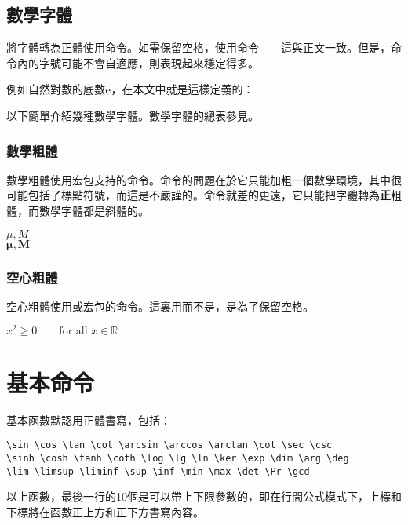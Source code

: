 \subsection{數學字體}
將字體轉為正體使用命令。如需保留空格，使用命令——這與正文一致。但是，命令內的字號可能不會自適應，則表現起來穩定得多。

例如自然對數的底數$\ue$，在本文中就是這樣定義的：
\begin{latex}
\newcommand{\ue}{\mathrm{e}}
\end{latex}

以下簡單介紹幾種數學字體。數學字體的總表參見。

\subsubsection{數學粗體}
數學粗體使用宏包支持的命令。命令的問題在於它只能加粗一個數學環境，其中很可能包括了標點符號，而這是不嚴謹的。命令就差的更遠，它只能把字體轉為\textbf{正}粗體，而數學字體都是斜體的。

\begin{codeshow}
$\mu,M$\\ $\boldsymbol{\mu},
\boldsymbol{M}$
\end{codeshow}

\subsubsection{空心粗體}
空心粗體使用或宏包的命令。這裏用而不是，是為了保留空格。

\begin{codeshow}
$x^2 \geq 0 \qquad
\textrm{for all }x\in\mathbb{R}$
\end{codeshow}

\section{基本命令}
基本函數默認用正體書寫，包括：
\begin{verbatim}
\sin \cos \tan \cot \arcsin \arccos \arctan \cot \sec \csc
\sinh \cosh \tanh \coth \log \lg \ln \ker \exp \dim \arg \deg 
\lim \limsup \liminf \sup \inf \min \max \det \Pr \gcd
\end{verbatim}

以上函數，最後一行的10個是可以帶上下限參數的，即在行間公式模式下，上標和下標將在函數正上方和正下方書寫內容。

